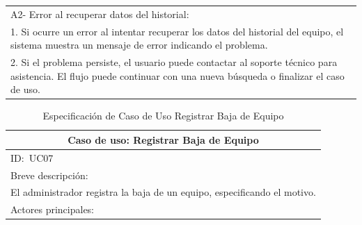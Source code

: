 \documentclass[stu, 12pt, letterpaper, donotrepeattitle, floatsintext, natbib]{apa7}
\begin{document}
\begin{longtable}{@{} p{16.5cm} @{}}
    A2- Error al recuperar datos del historial:                                                                                                                                            \\
    \hspace{1cm}1. Si ocurre un error al intentar recuperar los datos del historial del equipo, el sistema muestra un mensaje de error indicando el problema.                              \\
    \hspace{1cm}2. Si el problema persiste, el usuario puede contactar al soporte t\'ecnico para asistencia. El flujo puede continuar con una nueva b\'usqueda o finalizar el caso de uso. \\ \bottomrule
\end{longtable}
\newpage
\begin{longtable}{@{} p{16.5cm} @{}}
    \caption{Especificaci\'on de Caso de Uso Registrar Baja de Equipo}\label{tab:UC07}                                                                                                                                                  \\ \toprule
    \multicolumn{1}{c}{Caso de uso: Registrar Baja de Equipo}                                                                                                                                                                           \\ \midrule
    ID:~UC07                                                                                                                                                                                                                            \\ \midrule
    Breve descripci\'on:                                                                                                                                                                                                                \\
    El administrador registra la baja de un equipo, especificando el motivo.                                                                                                                                                            \\ \midrule
    Actores principales:                                                                                                                                                                                                                \\

\end{longtable}
\end{document}
